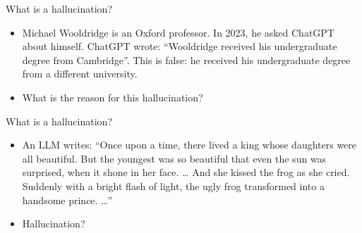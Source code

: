 \documentclass[11pt,compress,t,notes=noshow, xcolor=table]{beamer}
\begin{document}
\begin{vbframe}{What is a hallucination?}

\vfill


	\begin{itemize}


\item
Michael Wooldridge is an Oxford professor. In 2023, he
asked ChatGPT about himself. ChatGPT wrote:
``Wooldridge received his undergraduate degree from
Cambridge''. This is false:
he received his undergraduate degree from a different
university.

\item \ques What is the reason for this hallucination?

\end{itemize}

\vfill

\end{vbframe}


\begin{vbframe}{What is a hallucination?}

\vfill


	\begin{itemize}


\item An LLM writes:
``Once upon a time, there
lived a king whose daughters
were all beautiful. But the
youngest was so beautiful
that even the sun was
surprised, when it shone in
her face. \ldots
 And she kissed the frog as she cried.
       Suddenly with a bright flash of light, the ugly frog
       transformed into a handsome prince.
       \ldots''
       
\item \ques Hallucination?
\end{itemize}

\vfill

\end{vbframe}
\end{document}
